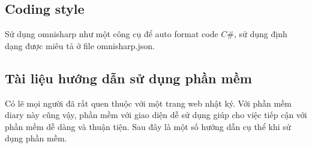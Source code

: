 \documentclass[a4paper]{article}
\begin{document}
\subsection{Coding style}

Sử dụng omnisharp như một công cụ để auto format code \(C\#\), sử dụng định dạng được miêu tả ở file omnisharp.json.


\subsection{Tài liệu hướng dẫn sử dụng phần mềm}

	Có lẽ mọi người đã rất quen thuộc với một trang web nhật ký. Với phần mềm diary này cũng vậy, phần mềm với giao diện dễ sử dụng giúp cho việc tiếp cận với phần mềm dễ dàng và thuận tiện. Sau đây là một số hướng dẫn cụ thể khi sử dụng phần mềm.
\end{document}
